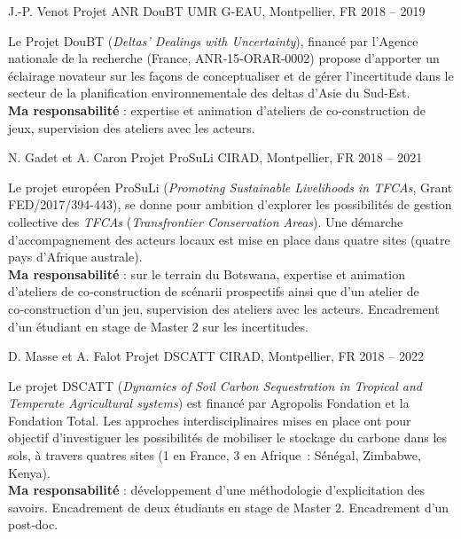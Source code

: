 \begin{cventries}
  \cventry
  {J.-P. Venot} %
  {Projet ANR DouBT} %
  {UMR G-EAU, Montpellier, FR} %
  {2018 -- 2019} %
  {
    \begin{cvitems} %
      Le Projet DouBT (\emph{Deltas' Dealings with Uncertainty}), financé par l'Agence nationale de la recherche (France, ANR‑15‑ORAR‑0002) propose d'apporter un éclairage novateur sur les façons de conceptualiser et de gérer l'incertitude dans le secteur de la planification environnementale des deltas d'Asie du Sud-Est.\\
      \textbf{Ma responsabilité} : expertise et animation d'ateliers de co-construction de jeux, supervision des ateliers avec les acteurs.
    \end{cvitems}
  }

  \cventry
  {N. Gadet et A. Caron} %
  {Projet ProSuLi} %
  {CIRAD, Montpellier, FR} %
  {2018 -- 2021} %
  {
    \begin{cvitems} %
      Le projet européen ProSuLi (\emph{Promoting Sustainable Livelihoods in TFCAs}, Grant FED/2017/394-443), se donne pour ambition d'explorer les possibilités de gestion collective des \emph{TFCAs} (\emph{Transfrontier Conservation Areas}). Une démarche d’accompagnement des acteurs locaux est mise en place dans quatre sites (quatre pays d’Afrique australe).\\
      \textbf{Ma responsabilité} : sur le terrain du Botswana, expertise et animation d’ateliers de co‑construction de scénarii prospectifs ainsi que d’un atelier de co‑construction d'un jeu, supervision des ateliers avec les acteurs. Encadrement d’un étudiant en stage de Master 2 sur les incertitudes.
    \end{cvitems}
  }

  \cventry
  {D. Masse et A. Falot} %
  {Projet DSCATT} %
  {CIRAD, Montpellier, FR} %
  {2018 -- 2022} %
  {
    \begin{cvitems} %
        Le projet DSCATT (\emph{Dynamics of Soil Carbon Sequestration in Tropical and Temperate Agricultural systems}) est financé par Agropolis Fondation et la Fondation Total. Les approches interdisciplinaires mises en place ont pour objectif d’investiguer les possibilités de mobiliser le stockage du carbone dans les sols, à travers quatres sites (1 en France, 3 en Afrique : Sénégal, Zimbabwe, Kenya).\\
        \textbf{Ma responsabilité} : développement d’une méthodologie d’explicitation des savoirs. Encadrement de deux étudiants en stage de Master 2. Encadrement d’un post‑doc.
    \end{cvitems}
  }


\end{cventries}
